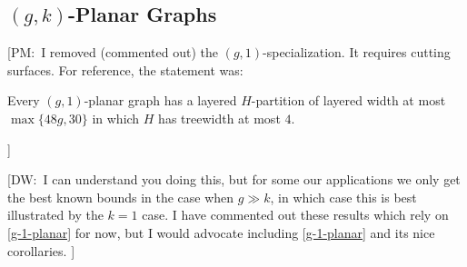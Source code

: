 \documentclass{patmorin}
\newcommand{\note}[2]{{\color{red}[#1:~#2]}}
\DeclareMathOperator{\dist}{dist}
\renewcommand{\ge}{\geqslant}
\renewcommand{\le}{\leqslant}
\begin{document}
\subsection{\boldmath  $(g,k)$-Planar Graphs}
\label{sec-g-k-planar}


\note{PM}{I removed (commented out) the $(g,1)$-specialization. It requires cutting surfaces.  For reference, the statement was:
\begin{thm}
\label{g-1-planar}
Every $(g,1)$-planar graph has a layered $H$-partition of layered width at most $\max\{48g, 30\}$ in which $H$ has treewidth at most $4$.  
\end{thm}
}
\note{DW}{I can understand you doing this, but for some our applications we only get the best known bounds in the case when $g\gg k$, in which case this is best illustrated by the $k=1$ case. I have commented out these results which rely on  \cref{g-1-planar} for now, but I would advocate including  \cref{g-1-planar} and its nice corollaries. }
% 
% 
% 
% 
\end{document}
